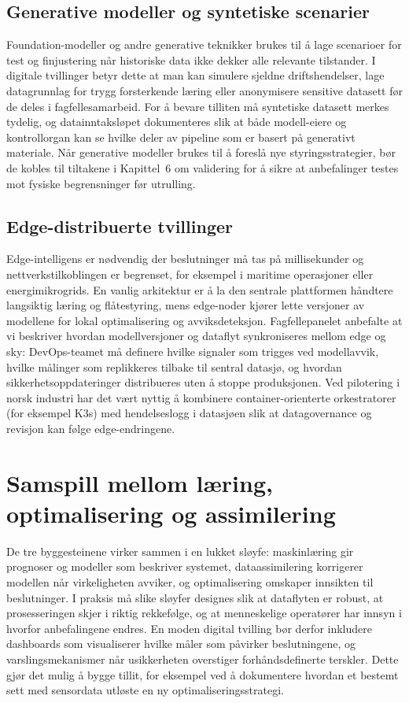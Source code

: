 \subsection{Generative modeller og syntetiske scenarier}
Foundation-modeller og andre generative teknikker brukes til å lage scenarioer for test og finjustering når historiske data ikke dekker alle relevante tilstander.\citep{bommasani2021opportunities} I digitale tvillinger betyr dette at man kan simulere sjeldne driftshendelser, lage datagrunnlag for trygg forsterkende læring eller anonymisere sensitive datasett før de deles i fagfellesamarbeid. For å bevare tilliten må syntetiske datasett merkes tydelig, og datainntaksløpet dokumenteres slik at både modell-eiere og kontrollorgan kan se hvilke deler av pipeline som er basert på generativt materiale. Når generative modeller brukes til å foreslå nye styringsstrategier, bør de kobles til tiltakene i Kapittel~6 om validering for å sikre at anbefalinger testes mot fysiske begrensninger før utrulling.

\subsection{Edge-distribuerte tvillinger}
Edge-intelligens er nødvendig der beslutninger må tas på millisekunder og nettverkstilkoblingen er begrenset, for eksempel i maritime operasjoner eller energimikrogrids.\citep{shi2016edge} En vanlig arkitektur er å la den sentrale plattformen håndtere langsiktig læring og flåtestyring, mens edge-noder kjører lette versjoner av modellene for lokal optimalisering og avviksdeteksjon. Fagfellepanelet anbefalte at vi beskriver hvordan modellversjoner og dataflyt synkroniseres mellom edge og sky: DevOps-teamet må definere hvilke signaler som trigges ved modellavvik, hvilke målinger som replikkeres tilbake til sentral datasjø, og hvordan sikkerhetsoppdateringer distribueres uten å stoppe produksjonen. Ved pilotering i norsk industri har det vært nyttig å kombinere container-orienterte orkestratorer (for eksempel K3s) med hendelseslogg i datasjøen slik at datagovernance og revisjon kan følge edge-endringene.

\section{Samspill mellom læring, optimalisering og assimilering}
De tre byggesteinene virker sammen i en lukket sløyfe: maskinlæring gir prognoser og modeller som beskriver systemet, dataassimilering korrigerer modellen når virkeligheten avviker, og optimalisering omskaper innsikten til beslutninger. I praksis må slike sløyfer designes slik at dataflyten er robust, at prosesseringen skjer i riktig rekkefølge, og at menneskelige operatører har innsyn i hvorfor anbefalingene endres. En moden digital tvilling bør derfor inkludere dashboards som visualiserer hvilke måler som påvirker beslutningene, og varslingsmekanismer når usikkerheten overstiger forhåndsdefinerte terskler. Dette gjør det mulig å bygge tillit, for eksempel ved å dokumentere hvordan et bestemt sett med sensordata utløste en ny optimaliseringsstrategi.

